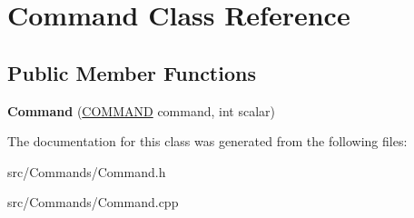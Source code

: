 \hypertarget{classCommand}{}\section{Command Class Reference}
\label{classCommand}
\subsection*{Public Member Functions}
\begin{DoxyCompactItemize}
\item 
\hypertarget{classCommand_aa8f47dd5fd5fad41ac703e25ae0a120c}{}{\bfseries Command} (\hyperlink{Protocol_8h_a0fbada5bff0eeb4dc6be4b6e6f1c4eaf}{C\+O\+M\+M\+A\+N\+D} command, int scalar)\label{classCommand_aa8f47dd5fd5fad41ac703e25ae0a120c}

\end{DoxyCompactItemize}


The documentation for this class was generated from the following files\+:\begin{DoxyCompactItemize}
\item 
src/\+Commands/Command.\+h\item 
src/\+Commands/Command.\+cpp\end{DoxyCompactItemize}
